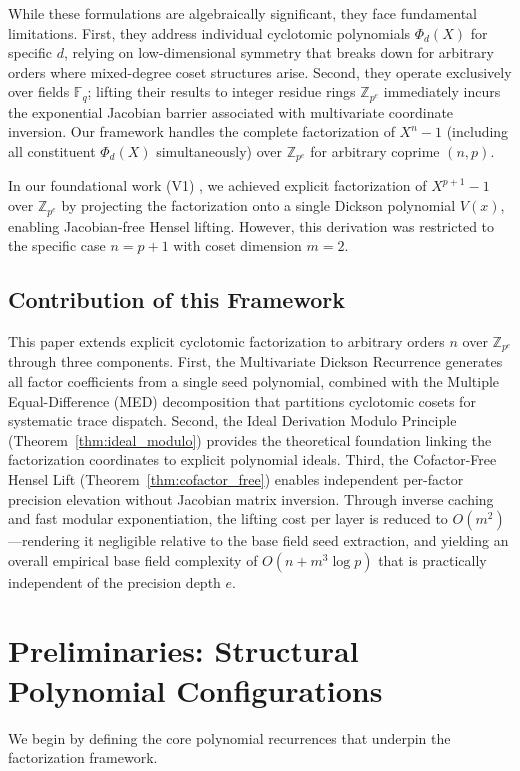 \documentclass[12pt]{article}
\theoremstyle{plain}
\begin{document}
While these formulations are algebraically significant, they face fundamental limitations. First, they address individual cyclotomic polynomials $\Phi_d(X)$ for specific $d$, relying on low-dimensional symmetry that breaks down for arbitrary orders where mixed-degree coset structures arise. Second, they operate exclusively over fields $\mathbb{F}_q$; lifting their results to integer residue rings $\mathbb{Z}_{p^e}$ immediately incurs the exponential Jacobian barrier associated with multivariate coordinate inversion. Our framework handles the complete factorization of $X^n - 1$ (including all constituent $\Phi_d(X)$ simultaneously) over $\mathbb{Z}_{p^e}$ for arbitrary coprime $(n, p)$.

In our foundational work (V1) \cite{Wang2026ISIT}, we achieved explicit factorization of $X^{p+1}-1$ over $\mathbb{Z}_{p^e}$ by projecting the factorization onto a single Dickson polynomial $V(x)$, enabling Jacobian-free Hensel lifting. However, this derivation was restricted to the specific case $n = p+1$ with coset dimension $m = 2$.

\subsection{Contribution of this Framework}
This paper extends explicit cyclotomic factorization to arbitrary orders $n$ over $\mathbb{Z}_{p^e}$ through three components. First, the Multivariate Dickson Recurrence generates all factor coefficients from a single seed polynomial, combined with the Multiple Equal-Difference (MED) decomposition \cite{Zhu_MED} that partitions cyclotomic cosets for systematic trace dispatch. Second, the Ideal Derivation Modulo Principle (Theorem~\ref{thm:ideal_modulo}) provides the theoretical foundation linking the factorization coordinates to explicit polynomial ideals. Third, the Cofactor-Free Hensel Lift (Theorem~\ref{thm:cofactor_free}) enables independent per-factor precision elevation without Jacobian matrix inversion. Through inverse caching and fast modular exponentiation, the lifting cost per layer is reduced to $O(m^2)$---rendering it negligible relative to the base field seed extraction, and yielding an overall empirical base field complexity of $O(n + m^3 \log p)$ that is practically independent of the precision depth $e$.
\section{Preliminaries: Structural Polynomial Configurations}
We begin by defining the core polynomial recurrences that underpin the factorization framework.
\end{document}
